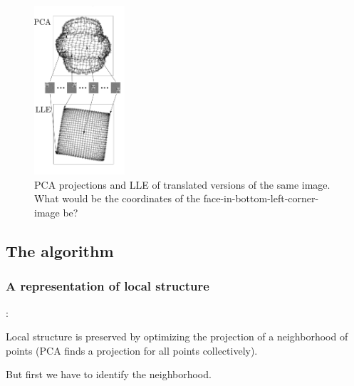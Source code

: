 \begin{frame}
 
\begin{figure}[ht]
	\centering
    \includegraphics[width=0.3\textwidth]{img/fig3_lle_intro_cropped.png}
	\caption{PCA projections and LLE of translated versions of the same image. What would be the coordinates of the face-in-bottom-left-corner-image be?}
	\label{fig:faces_translated_pca_lle}
\end{figure}
\end{frame}

\subsection{The algorithm}

\subsubsection{A representation of local structure}

\begin{frame}{\subsecname:~\subsubsecname}

Local structure is preserved by optimizing the projection of a neighborhood of points (PCA finds a projection for all points collectively).

\pause

But first we have to identify the neighborhood.

\end{frame}

